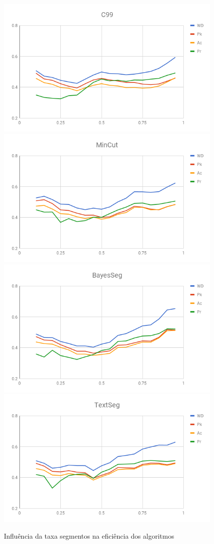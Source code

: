 \begin{figure}[!h] \centering     %

	  \includegraphics[width=.48\textwidth]{conteudo/capitulos/figs/graficos/analiseNSegRate-C99.png}
	  \includegraphics[width=.48\textwidth]{conteudo/capitulos/figs/graficos/analiseNSegRate-MinCut.png}
	  \includegraphics[width=.48\textwidth]{conteudo/capitulos/figs/graficos/analiseNSegRate-Bayes.png}
	  \includegraphics[width=.48\textwidth]{conteudo/capitulos/figs/graficos/analiseNSegRate-UISeg.png}
	\caption{Influência da taxa segmentos na eficiência dos algoritmos}
	\label{fig:influencia-SegRate}
\end{figure}




